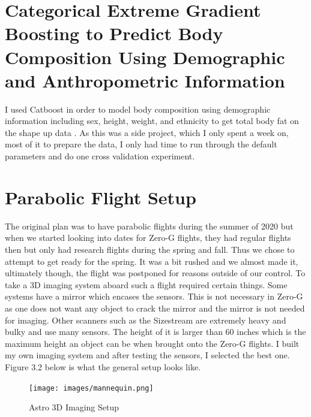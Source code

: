 \section{Categorical Extreme Gradient Boosting to Predict Body Composition Using Demographic and Anthropometric Information}
I used Catboost \cite{DBLP:journals/corr/DorogushGGKPV17} in order to model body composition using demographic information including sex, height, weight, and ethnicity to get total body fat on the shape up data \cite{article}. As this was a side project, which I only spent a week on, most of it to prepare the data, I only had time to run through the default parameters and do one cross validation experiment. 

\section{Parabolic Flight Setup}
The original plan was to have parabolic flights during the summer of 2020 but when we started looking into dates for Zero-G flights, they had regular flights then but only had research flights during the spring and fall. Thus we chose to attempt to get ready for the spring. It was a bit rushed and we almost made it, ultimately though, the flight was postponed for reasons outside of our control.
To take a 3D imaging system aboard such a flight required certain things. Some systems have a mirror which encases the sensors. This is not necessary in Zero-G as one does not want any object to crack the mirror and the mirror is not needed for imaging. Other scanners such as the Sizestream are extremely heavy and bulky and use many sensors. The height of it is larger than 60 inches which is the maximum height an object can be when brought onto the Zero-G flights. I built my own imaging system and after testing the sensors, I selected the best one.
Figure 3.2 below is what the general setup looks like.
\begin{figure}[!htb]
	\caption{Astro 3D Imaging Setup}
	\centering
	\texttt{[image: images/mannequin.png]}
\end{figure}

